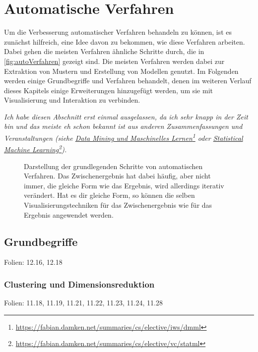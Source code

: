	\section{Automatische Verfahren}
		\label{sec:dataMining}

		Um die Verbesserung automatischer Verfahren behandeln zu können, ist es zunächst hilfreich, eine Idee davon zu bekommen, wie diese Verfahren arbeiten. Dabei gehen die meisten Verfahren ähnliche Schritte durch, die in \autoref{fig:autoVerfahren} gezeigt sind. Die meisten Verfahren werden dabei zur Extraktion von Mustern und Erstellung von Modellen genutzt. Im Folgenden werden einige Grundbegriffe und Verfahren behandelt, denen im weiteren Verlauf dieses Kapitels einige Erweiterungen hinzugefügt werden, um sie mit Visualisierung und Interaktion zu verbinden.

		 \emph{Ich habe diesen Abschnitt erst einmal ausgelassen, da ich sehr knapp in der Zeit bin und das meiste eh schon bekannt ist aus anderen Zusammenfassungen und Veranstaltungen (siehe \zB \href{https://fabian.damken.net/summaries/cs/elective/iws/dmml}{\emph{Data Mining und Maschinelles Lernen}}\footnote{\url{https://fabian.damken.net/summaries/cs/elective/iws/dmml}} oder \href{https://fabian.damken.net/summaries/cs/elective/vc/statml}{\emph{Statistical Machine Learning}}\footnote{\url{https://fabian.damken.net/summaries/cs/elective/vc/statml}}).}

		\begin{figure}
			\centering
			\begin{ivvaIntegration}
			\end{ivvaIntegration}
			\caption[Grundlegende Schritte automatischer Verfahren]{Darstellung der grundlegenden Schritte von automatischen Verfahren. Das Zwischenergebnis hat dabei häufig, aber nicht immer, die gleiche Form wie das Ergebnis, wird allerdings iterativ verändert. Hat es dir gleiche Form, so können die selben Visualisierungstechniken für das Zwischenergebnis wie für das Ergebnis angewendet werden.}
			\label{fig:autoVerfahren}
		\end{figure}

		\subsection{Grundbegriffe}
			  Folien: 12.16, 12.18

			\subsubsection{Clustering und Dimensionsreduktion}
				  Folien: 11.18, 11.19, 11.21, 11.22, 11.23, 11.24, 11.28

